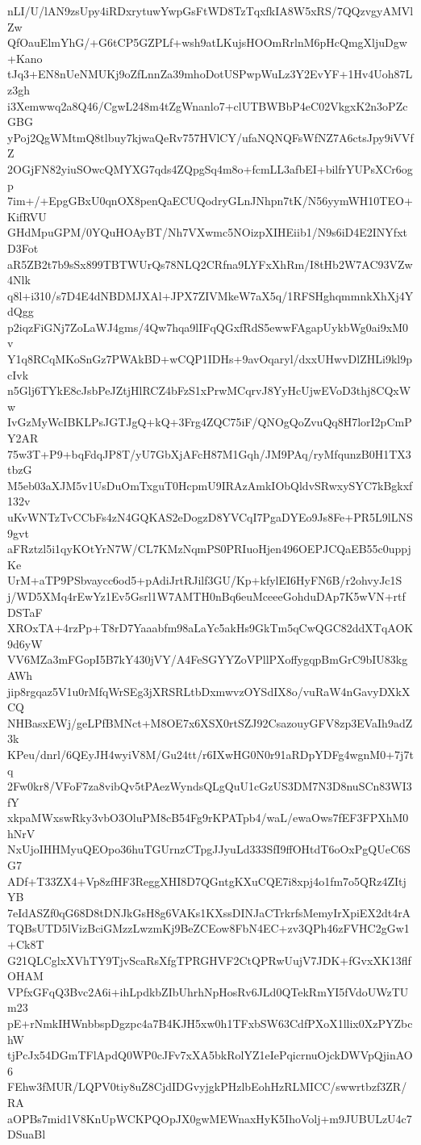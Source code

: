 nLI/U/lAN9zsUpy4iRDxrytuwYwpGsFtWD8TzTqxfkIA8W5xRS/7QQzvgyAMVlZw
QfOauElmYhG/+G6tCP5GZPLf+wsh9atLKujsHOOmRrlnM6pHcQmgXljuDgw+Kano
tJq3+EN8nUeNMUKj9oZfLnnZa39mhoDotUSPwpWuLz3Y2EvYF+1Hv4Uoh87Lz3gh
i3Xemwwq2a8Q46/CgwL248m4tZgWnanlo7+clUTBWBbP4eC02VkgxK2n3oPZcGBG
yPoj2QgWMtmQ8tlbuy7kjwaQeRv757HVlCY/ufaNQNQFsWfNZ7A6ctsJpy9iVVfZ
2OGjFN82yiuSOwcQMYXG7qds4ZQpgSq4m8o+fcmLL3afbEI+bilfrYUPsXCr6ogp
7im+/+EpgGBxU0qnOX8penQaECUQodryGLnJNhpn7tK/N56yymWH10TEO+KifRVU
GHdMpuGPM/0YQuHOAyBT/Nh7VXwmc5NOizpXIHEiib1/N9s6iD4E2INYfxtD3Fot
aR5ZB2t7b9sSx899TBTWUrQs78NLQ2CRfna9LYFxXhRm/I8tHb2W7AC93VZw4Nlk
q8l+i310/s7D4E4dNBDMJXAl+JPX7ZIVMkeW7aX5q/1RFSHghqmmnkXhXj4YdQgg
p2iqzFiGNj7ZoLaWJ4gms/4Qw7hqa9lIFqQGxfRdS5ewwFAgapUykbWg0ai9xM0v
Y1q8RCqMKoSnGz7PWAkBD+wCQP1IDHs+9avOqaryl/dxxUHwvDlZHLi9kl9pcIvk
n5Glj6TYkE8cJsbPeJZtjHlRCZ4bFzS1xPrwMCqrvJ8YyHcUjwEVoD3thj8CQxWw
IvGzMyWcIBKLPsJGTJgQ+kQ+3Frg4ZQC75iF/QNOgQoZvuQq8H7lorI2pCmPY2AR
75w3T+P9+bqFdqJP8T/yU7GbXjAFcH87M1Gqh/JM9PAq/ryMfqunzB0H1TX3tbzG
M5eb03aXJM5v1UsDuOmTxguT0HcpmU9IRAzAmkIObQldvSRwxySYC7kBgkxf132v
uKvWNTzTvCCbFs4zN4GQKAS2eDogzD8YVCqI7PgaDYEo9Js8Fe+PR5L9lLNS9gvt
aFRztzl5i1qyKOtYrN7W/CL7KMzNqmPS0PRIuoHjen496OEPJCQaEB55c0uppjKe
UrM+aTP9PSbvaycc6od5+pAdiJrtRJilf3GU/Kp+kfylEI6HyFN6B/r2ohvyJc1S
j/WD5XMq4rEwYz1Ev5Gsrl1W7AMTH0nBq6euMceeeGohduDAp7K5wVN+rtfDSTaF
XROxTA+4rzPp+T8rD7Yaaabfm98aLaYc5akHs9GkTm5qCwQGC82ddXTqAOK9d6yW
VV6MZa3mFGopI5B7kY430jVY/A4FeSGYYZoVPllPXoffygqpBmGrC9bIU83kgAWh
jip8rgqaz5V1u0rMfqWrSEg3jXRSRLtbDxmwvzOYSdIX8o/vuRaW4nGavyDXkXCQ
NHBasxEWj/geLPfBMNct+M8OE7x6XSX0rtSZJ92CsazouyGFV8zp3EVaIh9adZ3k
KPeu/dnrl/6QEyJH4wyiV8M/Gu24tt/r6IXwHG0N0r91aRDpYDFg4wgnM0+7j7tq
2Fw0kr8/VFoF7za8vibQv5tPAezWyndsQLgQuU1cGzUS3DM7N3D8nuSCn83WI3fY
xkpaMWxswRky3vbO3OluPM8cB54Fg9rKPATpb4/waL/ewaOws7fEF3FPXhM0hNrV
NxUjoIHHMyuQEOpo36huTGUrnzCTpgJJyuLd333SfI9ffOHtdT6oOxPgQUeC6SG7
ADf+T33ZX4+Vp8zfHF3ReggXHI8D7QGntgKXuCQE7i8xpj4o1fm7o5QRz4ZItjYB
7eIdASZf0qG68D8tDNJkGsH8g6VAKs1KXssDINJaCTrkrfsMemyIrXpiEX2dt4rA
TQBsUTD5lVizBciGMzzLwzmKj9BeZCEow8FbN4EC+zv3QPh46zFVHC2gGw1+Ck8T
G21QLCglxXVhTY9TjvScaRsXfgTPRGHVF2CtQPRwUujV7JDK+fGvxXK13flfOHAM
VPfxGFqQ3Bvc2A6i+ihLpdkbZIbUhrhNpHosRv6JLd0QTekRmYI5fVdoUWzTUm23
pE+rNmkIHWnbbspDgzpc4a7B4KJH5xw0h1TFxbSW63CdfPXoX1llix0XzPYZbchW
tjPcJx54DGmTFlApdQ0WP0cJFv7xXA5bkRolYZ1eIePqicrnuOjckDWVpQjinAO6
FEhw3fMUR/LQPV0tiy8uZ8CjdIDGvyjgkPHzlbEohHzRLMICC/swwrtbzf3ZR/RA
aOPBs7mid1V8KnUpWCKPQOpJX0gwMEWnaxHyK5IhoVolj+m9JUBULzU4c7DSuaBl
